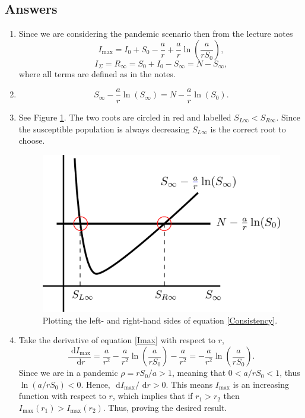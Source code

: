\documentclass[10pt]{article}
\newcommand{\bb}{\begin{equation}}
\newcommand{\ee}{\end{equation}}
\newcommand{\rd}{\text{ d}}
\newcommand{\fig}[1]{Figure \ref{#1}}
\newcommand{\eqn}[1]{equation \eqref{#1}}
\newcommand{\ttp}{.45\textwidth}
\renewcommand{\l}{\left(}
\renewcommand{\r}{\right)}
\begin{document}
\begin{Answ}
\subsection{Answers}
\begin{enumerate}
\item Since we are considering the pandemic scenario then from the lecture notes
\bb
I_{\textrm{max}}=I_0+S_0-\frac{a}{r}+\frac{a}{r}\ln\l\frac{a}{rS_0}\r,\label{Imax}
\ee
\bb
I_{\Sigma}=R_\infty=S_0+I_0-S_\infty=N-S_\infty,
\ee
where all terms are defined as in the notes.

\item 
\bb
S_\infty-\frac{a}{r}\ln\l S_\infty\r=N-\frac{a}{r}\ln\l S_0\r.\label{Consistency}
\ee
\item See \fig{Consistency_equation}. The two roots are circled in red and labelled $S_{L\infty}<S_{R\infty}$. Since the susceptible population is always decreasing $S_{L\infty}$ is the correct root to choose.
\begin{figure}[h!!!tb]
\centering
\includegraphics[width=\ttp]{../../Pictures/Consistency_equation}
\caption{\label{Consistency_equation} Plotting the left- and right-hand sides of \eqn{Consistency}.}
\end{figure}

\item Take the derivative of \eqn{Imax} with respect to $r$,
\bb
\frac{\rd I_{\textrm{max}}}{\rd r}=\frac{a}{r^2}-\frac{a}{r^2}\ln\l\frac{a}{rS_0}\r-\frac{a}{r^2}=-\frac{a}{r^2}\ln\l\frac{a}{rS_0}\r.
\ee
Since we are in a pandemic $\rho=rS_0/a>1$, meaning that $0<a/rS_0<1$, thus $\ln\l a/rS_0\r<0$. Hence, $\rd I_{\textrm{max}}/\rd r>0$. This means $I_{\textrm{max}}$ is an increasing function with respect to $r$, which implies that if $r_1>r_2$ then $I_{\textrm{max}}(r_1)>I_{\textrm{max}}(r_2)$. Thus, proving the desired result.


\end{enumerate}
\end{Answ}
\end{document}
